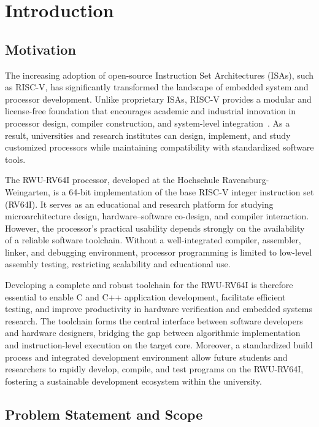\chapter{Introduction}
\label{ch:introduction}

\section{Motivation}
The increasing adoption of open-source Instruction Set Architectures (ISAs), such as RISC-V, has significantly transformed the landscape of embedded system and processor development.  
Unlike proprietary ISAs, RISC-V provides a modular and license-free foundation that encourages academic and industrial innovation in processor design, compiler construction, and system-level integration~\cite{riscv-spec}.  
As a result, universities and research institutes can design, implement, and study customized processors while maintaining compatibility with standardized software tools.

The RWU-RV64I processor, developed at the Hochschule Ravensburg-Weingarten, is a 64-bit implementation of the base RISC-V integer instruction set (RV64I).  
It serves as an educational and research platform for studying microarchitecture design, hardware–software co-design, and compiler interaction.  
However, the processor’s practical usability depends strongly on the availability of a reliable software toolchain.  
Without a well-integrated compiler, assembler, linker, and debugging environment, processor programming is limited to low-level assembly testing, restricting scalability and educational use.

Developing a complete and robust toolchain for the RWU-RV64I is therefore essential to enable C and C++ application development, facilitate efficient testing, and improve productivity in hardware verification and embedded systems research.  
The toolchain forms the central interface between software developers and hardware designers, bridging the gap between algorithmic implementation and instruction-level execution on the target core.  
Moreover, a standardized build process and integrated development environment allow future students and researchers to rapidly develop, compile, and test programs on the RWU-RV64I, fostering a sustainable development ecosystem within the university.

\section{Problem Statement and Scope}


